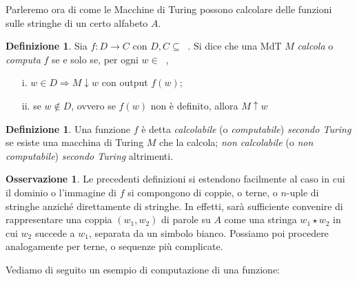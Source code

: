 \documentclass[12pt,a4paper]{report}
\theoremstyle{definition}
\newtheorem{defn}[teo]{Definizione}  %
\newtheorem{oss}[teo]{Osservazione}  %
\DeclareMathOperator{\aaa}{\textit{A}^{\star}}
\begin{document}
Parleremo ora di come le Macchine di Turing possono calcolare delle funzioni sulle stringhe di un certo alfabeto $A$.

\begin{defn}
Sia $f : D \longrightarrow C$ con $D,C \subseteq \aaa$. Si dice che una MdT $M$ \emph{calcola} o \emph{computa} $f$ se e solo se, per ogni $w \in \aaa$, 
\begin{enumerate}
\item[i.] $w \in D \Longrightarrow M \downarrow w$ con output $f(w)$;
\item[ii.] se $w \not\in D$, ovvero se $f(w)$ non è definito, allora $M \uparrow w$
\end{enumerate}
\end{defn}

\begin{defn}
Una funzione $f$ è detta \emph{calcolabile} (o \emph{computabile}) \emph{secondo Turing} se esiste una macchina di Turing $M$ che la calcola; \emph{non calcolabile} (o \emph{non computabile}) \emph{secondo Turing} altrimenti.
\end{defn}

\begin{oss}\label{coppie_stringhe}
Le precedenti definizioni si estendono facilmente al caso in cui il dominio o l'immagine di $f$ si compongono di coppie, o terne, o $n$-uple di stringhe anziché direttamente di stringhe. In effetti, sarà sufficiente convenire di rappresentare una coppia $(w_1,w_2)$ di parole su $A$ come una stringa $w_1 \star w_2$ in cui $w_2$ succede a $w_1$, separata da un simbolo bianco. Possiamo poi procedere analogamente per terne, o sequenze più complicate.
\end{oss}

Vediamo di seguito un esempio di computazione di una funzione:
\end{document}
